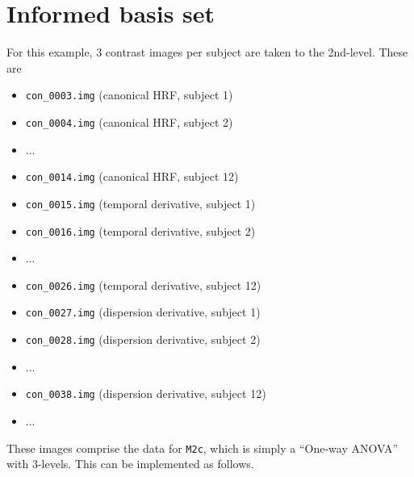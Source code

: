 \section{Informed basis set}

For this example, 3 contrast images per subject are taken to the 2nd-level. These are

\begin{itemize}
\item \texttt{con\_0003.img}       (canonical HRF, subject 1)
\item \texttt{con\_0004.img}       (canonical HRF, subject 2)
\item ...
\item \texttt{con\_0014.img}       (canonical HRF, subject 12)
\item \texttt{con\_0015.img}       (temporal derivative, subject 1)
\item \texttt{con\_0016.img}       (temporal derivative, subject 2)
\item ...
\item \texttt{con\_0026.img}       (temporal derivative, subject 12)
\item \texttt{con\_0027.img}       (dispersion derivative, subject 1)
\item \texttt{con\_0028.img}       (dispersion derivative, subject 2)
\item ...
\item \texttt{con\_0038.img}       (dispersion derivative, subject 12)
\item ...
\end{itemize}
These images comprise the data for \texttt{M2c}, which is simply a ``One-way ANOVA'' with 3-levels. This can be implemented as follows.
